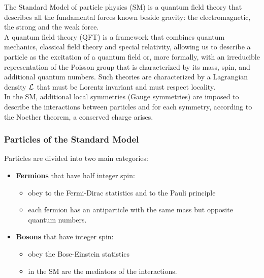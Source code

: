 \label{sec:TH}
\minitoc
The Standard Model of particle physics (SM) is a quantum field theory that describes all the fundamental forces known beside gravity: the electromagnetic, the strong and the weak force. \\
A quantum field theory (QFT) is a framework that combines quantum mechanics, classical field theory and special relativity, allowing us to describe a particle as the excitation of a quantum field or, more formally, with an irreducible representation of the Poisson group that is characterized by its mass, spin, and additional quantum numbers.
Such theories are characterized by a Lagrangian density $\mathcal{L}_\text{}$ that must be Lorentz invariant and must respect locality. \\
In the SM, additional local symmetries (Gauge symmetries) are imposed to describe the interactions between particles and for each symmetry, according to the Noether theorem, a conserved charge arises.

\subsubsection*{Particles of the Standard Model}
Particles are divided into two main categories:
\begin{itemize}
    \item \textbf{Fermions} that have half integer spin:
    \begin{itemize}
        \item obey to the Fermi-Dirac statistics and to the Pauli principle
        \item each fermion has an antiparticle with the same mass but opposite quantum numbers.
    \end{itemize}
    \item \textbf{Bosons} that have integer spin:
    \begin{itemize}
        \item obey the Bose-Einstein statistics
        \item in the SM are the mediators of the interactions.
    \end{itemize}
\end{itemize}

